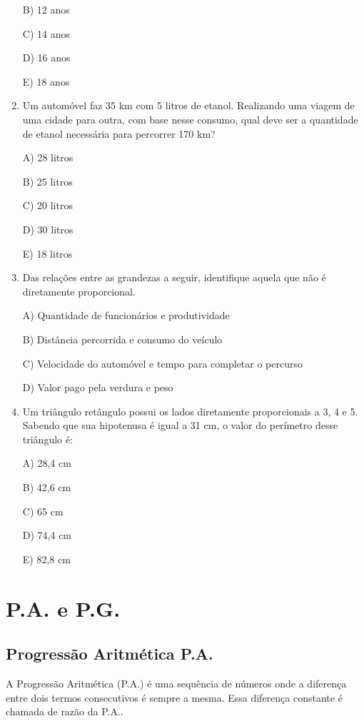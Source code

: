 \begin{multicols*}{2}
\begin{enumerate}
		      B) 12 anos

		      C) 14 anos

		      D) 16 anos

		      E) 18 anos

		\item Um automóvel faz 35 km com 5 litros de etanol. Realizando uma viagem de uma cidade para outra, com base nesse consumo, qual deve ser a quantidade de etanol necessária para percorrer 170 km?

		      A) 28 litros

		      B) 25 litros

		      C) 20 litros

		      D) 30 litros

		      E) 18 litros

		\item Das relações entre as grandezas a seguir, identifique aquela que não é diretamente proporcional.

		      A) Quantidade de funcionários e produtividade

		      B) Distância percorrida e consumo do veículo

		      C) Velocidade do automóvel e tempo para completar o percurso

		      D) Valor pago pela verdura e peso

		\item Um triângulo retângulo possui os lados diretamente proporcionais a 3, 4 e 5. Sabendo que sua hipotenusa é igual a 31 cm, o valor do perímetro desse triângulo é:

		      A) 28,4 cm

		      B) 42,6 cm

		      C) 65 cm

		      D) 74,4 cm

		      E) 82,8 cm

	\end{enumerate}

	\section{P.A. e P.G.}

	\subsection{Progressão Aritmética P.A.}

	A Progressão Aritmética (P.A.) é uma sequência de números onde a diferença entre dois termos consecutivos é sempre a mesma. Essa diferença constante é chamada de razão da P.A..


\end{multicols*}
